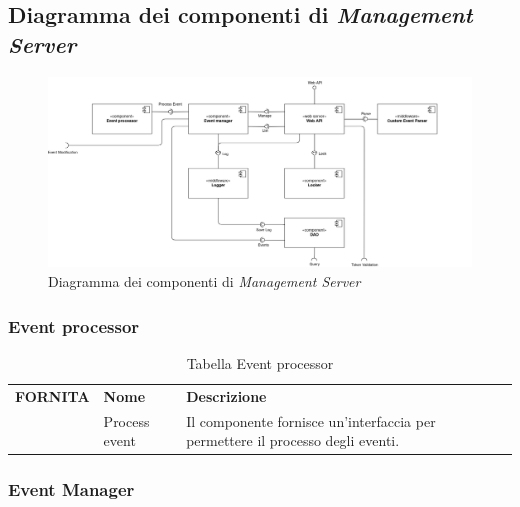 \documentclass{article}
\begin{document}
\subsection{Diagramma dei componenti di \textit{Management Server}}

\begin{figure}[htbp]
    \centering
    \includegraphics[width=1\textwidth]{Images/ComponentDiagram_Management.png}
    \caption{Diagramma dei componenti di \textit{Management Server}}
    \label{fig:component-diagram-management}
\end{figure}    

\subsubsection{Event processor}

\begin{table}[htbp]
    \centering
    \renewcommand{\arraystretch}{1.3} %
    \begin{tabularx}{\textwidth}{| l | l | X |}
        \Xhline{2pt}
        \textbf{FORNITA} & \textbf{Nome} & \textbf{Descrizione} \\
        \Xhline{2pt}
         & Process event & Il componente fornisce un'interfaccia per permettere il processo degli eventi. \\
        \hline
    \end{tabularx}
    \caption{Tabella Event processor}
\end{table}


\clearpage

\subsubsection{Event Manager}
\end{document}
